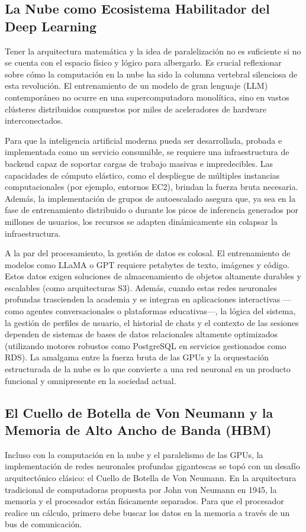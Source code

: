 \documentclass[12pt,a4paper]{article}
\begin{document}
\subsection{La Nube como Ecosistema Habilitador del Deep Learning}

Tener la arquitectura matemática y la idea de paralelización no es suficiente si no se cuenta con el espacio físico y lógico para albergarlo. Es crucial reflexionar sobre cómo la computación en la nube ha sido la columna vertebral silenciosa de esta revolución. El entrenamiento de un modelo de gran lenguaje (LLM) contemporáneo no ocurre en una supercomputadora monolítica, sino en vastos clústeres distribuidos compuestos por miles de aceleradores de hardware interconectados.

Para que la inteligencia artificial moderna pueda ser desarrollada, probada e implementada como un servicio consumible, se requiere una infraestructura de backend capaz de soportar cargas de trabajo masivas e impredecibles. Las capacidades de cómputo elástico, como el despliegue de múltiples instancias computacionales (por ejemplo, entornos EC2), brindan la fuerza bruta necesaria. Además, la implementación de grupos de autoescalado asegura que, ya sea en la fase de entrenamiento distribuido o durante los picos de inferencia generados por millones de usuarios, los recursos se adapten dinámicamente sin colapsar la infraestructura.

A la par del procesamiento, la gestión de datos es colosal. El entrenamiento de modelos como LLaMA o GPT requiere petabytes de texto, imágenes y código. Estos datos exigen soluciones de almacenamiento de objetos altamente durables y escalables (como arquitecturas S3). Además, cuando estas redes neuronales profundas trascienden la academia y se integran en aplicaciones interactivas —como agentes conversacionales o plataformas educativas—, la lógica del sistema, la gestión de perfiles de usuario, el historial de chats y el contexto de las sesiones dependen de sistemas de bases de datos relacionales altamente optimizados (utilizando motores robustos como PostgreSQL en servicios gestionados como RDS). La amalgama entre la fuerza bruta de las GPUs y la orquestación estructurada de la nube es lo que convierte a una red neuronal en un producto funcional y omnipresente en la sociedad actual.

\subsection{El Cuello de Botella de Von Neumann y la Memoria de Alto Ancho de Banda (HBM)}
Incluso con la computación en la nube y el paralelismo de las GPUs, la implementación de redes neuronales profundas gigantescas se topó con un desafío arquitectónico clásico: el Cuello de Botella de Von Neumann. En la arquitectura tradicional de computadoras propuesta por John von Neumann en 1945, la memoria y el procesador están físicamente separados. Para que el procesador realice un cálculo, primero debe buscar los datos en la memoria a través de un bus de comunicación.
\end{document}
